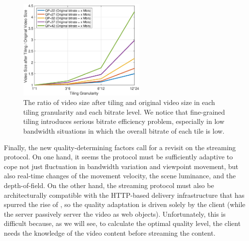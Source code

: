 \begin{figure}
  \centering
  \includegraphics[width=2.5in]{images/bitrateefficiency.eps}
  \caption{The ratio of video size after tiling and original video size in each tiling granularity and each bitrate level. We notice that fine-grained tiling introduces serious bitrate efficiency problem, especially in low bandwidth situations in which the overall bitrate of each tile is low. }
  \label{fig:bitrate-efficiency}
  \end{figure}

Finally, the new quality-determining factors call for a revisit on the streaming protocol. 
On one hand, it seems the protocol must be sufficiently adaptive to cope not just fluctuation in bandwidth variation and viewpoint movement, but also real-time changes of the movement velocity, the scene luminance, and the depth-of-field. 
On the other hand, the streaming protocol must also be architecturally compatible with the HTTP-based delivery infrastructure that has spurred the rise of \vrvideos, so the quality adaptation is driven solely by the client (while the server passively server the video as web objects). 
Unfortunately, this is difficult because, as we will see, to calculate the optimal quality level, the client needs the knowledge of the video content before streaming the content. 




